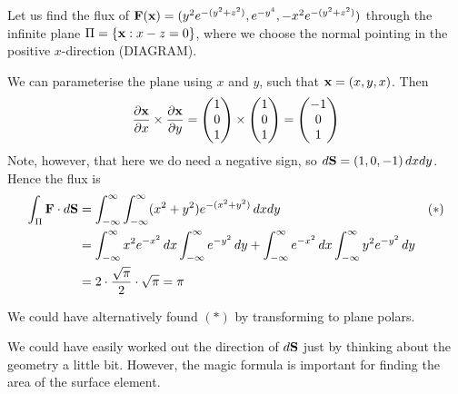 \documentclass{../template/note}
\begin{document}
    \begin{example*}
        Let us find the flux of \(\V F(\V x) = (y^2 e^{-(y^2+z^2)}, e^{-y^4}, -x^2e^{-(y^2+z^2)})\) through the infinite plane \(\Pi = \{\V x: x - z = 0\}\), where we choose the normal pointing in the positive \(x\)-direction (DIAGRAM).

        We can parameterise the plane using \(x\) and \(y\), such that \(\V x = (x, y, x)\). Then
        \begin{align*}
            \pd{\V x}{x} \times \pd{\V x}{y} = \begin{pmatrix}
             1 \\
             0 \\
             1 \\
            \end{pmatrix} \times \begin{pmatrix}
             1 \\
             0 \\
             1 \\
            \end{pmatrix} = \begin{pmatrix}
             -1 \\
             0 \\
             1 \\
            \end{pmatrix}
        \end{align*}
        Note, however, that here we do need a negative sign, so \(d\V S = (1, 0, -1) \D x dy\). Hence the flux is
        \begin{align*}
            \int_\Pi \V F \cdot d\V S &= \int_{-\infty}^\infty \int_{-\infty}^\infty (x^2+y^2) e^{-(x^2+y^2)} \D x dy && (*)\\
            &= \int_{-\infty}^\infty x^2 e^{-x^2} \D x \int_{-\infty}^\infty e^{-y^2} \D y + \int_{-\infty}^\infty e^{-x^2} \D x \int_{-\infty}^\infty y^2 e^{-y^2} \D y \\
            &= 2 \cdot \frac{\sqrt \pi}{2} \cdot \sqrt \pi = \pi
        \end{align*}
    \end{example*}
    
    \begin{remark*}
        We could have alternatively found \((*)\) by transforming to plane polars.
    \end{remark*}
    
    \begin{remark*}
        We could have easily worked out the direction of \(d\V S\) just by thinking about the geometry a little bit. However, the magic formula is important for finding the area of the surface element.
    \end{remark*}
    
\end{document}
